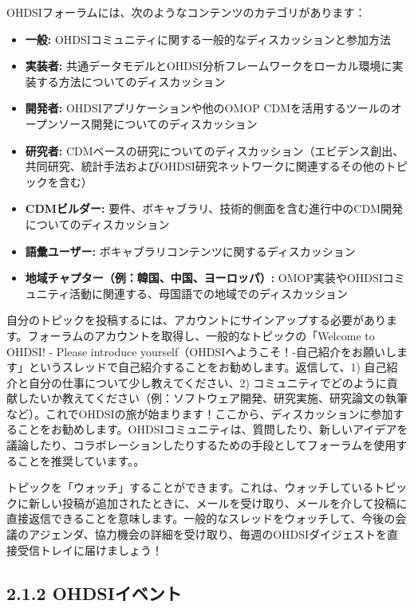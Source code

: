 \documentclass[
  11pt]{book}
\makeatletter
\providecommand{\tightlist}{%
  \setlength{\itemsep}{0pt}\setlength{\parskip}{0pt}}
\newenvironment{kframe}{%
\medskip{}
\setlength{\fboxsep}{.8em}
 \def\at@end@of@kframe{}%
 \ifinner\ifhmode%
  \def\at@end@of@kframe{\end{minipage}}%
  \begin{minipage}{\columnwidth}%
 \fi\fi%
 \def\FrameCommand##1{\hskip\@totalleftmargin \hskip-\fboxsep
 \colorbox{myShadeColor}{##1}\hskip-\fboxsep
     \hskip-\linewidth \hskip-\@totalleftmargin \hskip\columnwidth}%
 \MakeFramed {\advance\hsize-\width
   \@totalleftmargin\z@ \linewidth\hsize
   \@setminipage}}%
 {\par\unskip\endMakeFramed%
 \at@end@of@kframe}
\newenvironment{rmdblock}[1]
  {
  \begin{itemize}
  \renewcommand{\labelitemi}{
    \raisebox{-.7\height}[0pt][0pt]{
      {\setkeys{Gin}{width=3em,keepaspectratio}\texttt{[image: images/\#1]}}
    }
  }
  \setlength{\fboxsep}{1em}
  \begin{kframe}
  \item
  }
  {
  \end{kframe}
  \end{itemize}
  }
\newenvironment{rmdimportant}
  {\begin{rmdblock}{important}}
  {\end{rmdblock}}
\theoremstyle{definition}
\theoremstyle{definition}
\theoremstyle{definition}
\theoremstyle{definition}
\theoremstyle{remark}
\makeatother
\begin{document}
OHDSIフォーラムには、次のようなコンテンツのカテゴリがあります：

\begin{itemize}
\tightlist
\item
  \textbf{一般:} OHDSIコミュニティに関する一般的なディスカッションと参加方法
\item
  \textbf{実装者:} 共通データモデルとOHDSI分析フレームワークをローカル環境に実装する方法についてのディスカッション
\item
  \textbf{開発者:} OHDSIアプリケーションや他のOMOP CDMを活用するツールのオープンソース開発についてのディスカッション
\item
  \textbf{研究者:} CDMベースの研究についてのディスカッション（エビデンス創出、共同研究、統計手法およびOHDSI研究ネットワークに関連するその他のトピックを含む）
\item
  \textbf{CDMビルダー:} 要件、ボキャブラリ、技術的側面を含む進行中のCDM開発についてのディスカッション
\item
  \textbf{語彙ユーザー:} ボキャブラリコンテンツに関するディスカッション
\item
  \textbf{地域チャプター（例：韓国、中国、ヨーロッパ）:} OMOP実装やOHDSIコミュニティ活動に関連する、母国語での地域でのディスカッション
\end{itemize}

自分のトピックを投稿するには、アカウントにサインアップする必要があります。フォーラムのアカウントを取得し、一般的なトピックの「Welcome to OHDSI! - Please introduce yourself（OHDSIへようこそ！-自己紹介をお願いします」というスレッドで自己紹介することをお勧めします。返信して、1) 自己紹介と自分の仕事について少し教えてください、2) コミュニティでどのように貢献したいか教えてください（例：ソフトウェア開発、研究実施、研究論文の執筆など）。これでOHDSIの旅が始まります！ここから、ディスカッションに参加することをお勧めします。OHDSIコミュニティは、質問したり、新しいアイデアを議論したり、コラボレーションしたりするための手段としてフォーラムを使用することを推奨しています。。

\begin{rmdimportant}
トピックを「ウォッチ」することができます。これは、ウォッチしているトピックに新しい投稿が追加されたときに、メールを受け取り、メールを介して投稿に直接返信できることを意味します。一般的なスレッドをウォッチして、今後の会議のアジェンダ、協力機会の詳細を受け取り、毎週のOHDSIダイジェストを直接受信トレイに届けましょう！
\end{rmdimportant}

\subsection{2.1.2 OHDSIイベント}\label{ohdsiux30a4ux30d9ux30f3ux30c8}
\end{document}
